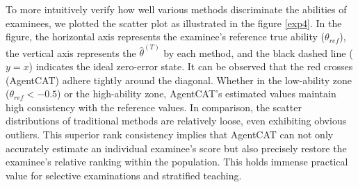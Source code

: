 
To more intuitively verify how well various methods discriminate the abilities of examinees, we plotted the scatter plot as illustrated in the figure \ref{exp4}. In the figure, the horizontal axis represents the examinee's reference true ability ($\theta_{ref}$), the vertical axis represents the $\hat{\theta}^{(T)}$ by each method, and the black dashed line ($y=x$) indicates the ideal zero-error state.  It can be observed that the red crosses (AgentCAT) adhere tightly around the diagonal. Whether in the low-ability zone ($\theta_{ref} < -0.5$) or the high-ability zone, AgentCAT's estimated values maintain high consistency with the reference values. In comparison, the scatter distributions of traditional methods are relatively loose, even exhibiting obvious outliers. This superior rank consistency implies that AgentCAT can not only accurately estimate an individual examinee's score but also precisely restore the examinee's relative ranking within the population. This holds immense practical value for selective examinations and stratified teaching. 


